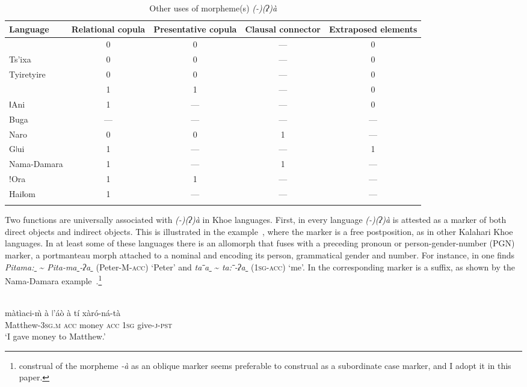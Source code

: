 \documentclass[output=paper]{LSP/langsci}
\begin{document}
\begin{table}[t]
\caption{Other uses of morpheme(s) \textit{(-)(ʔ)à}}\label{09-mc-tab:4}
{\small \begin{tabularx}{\textwidth}{XCCCC}
\lsptoprule
{\bfseries Language} & {\bfseries Relational copula} & {\bfseries Presentative copula} & {\bfseries Clausal connector} & {\bfseries Extraposed elements}\\
\midrule
{} & 0 & 0 & — & 0\\
Ts’ixa & 0 & 0 & — & 0\\
Tyiretyire & 0 & 0 & — & 0\\
 & 1 & 1 & — & 0\\
ǁAni & 1 & — & — & 0\\
Buga & — & — & — & —\\
Naro & 0 & 0 & 1 & —\\
Gǀui & 1 & — & — & 1\\
Nama-Damara & 1 & — & 1 & —\\
!Ora & 1 & 1 & — & —\\
Haiǁom & 1 & — & — & —\\
\lspbottomrule
\end{tabularx}}
\end{table}

\largerpage[-1]
Two functions are universally associated with \textit{(-)(ʔ)à} in Khoe languages. First, in every language \textit{(-)(ʔ)à} is attested as a marker of both direct objects and indirect objects. This is illustrated in the  example~, where the marker is a free postposition, as in other Kalahari Khoe languages. In at least some of these languages there is an allomorph that fuses with a preceding pronoun or person-gender-number (PGN) marker, a portmanteau morph attached to a nominal and encoding its person, grammatical gender and number. For instance, in  one finds \textit{Pitama:}\textit{ˍ} {\textasciitilde} \textit{Pita-maˍ-ʔaˍ} (Peter-\textsc{M}-\textsc{acc}) ‘Peter’ and \textit{ta}\textit{ˉ}\textit{a}\textit{ˍ} {\textasciitilde} \textit{ta:}\textit{ˉ{}-ʔ}\textit{a}\textit{ˍ} (1\textsc{sg}-\textsc{acc}) ‘me’. In  the corresponding marker is a suffix, as shown by the Nama-Damara example~.\footnote{ construal of the morpheme \emph{-à} as an oblique marker seems preferable to  construal as a subordinate case marker, and I adopt it in this paper.}

  
\begin{exe}
\ex\label{09-mc-ex:1}
\\
\gll màtìaci-\`{m} à ǀ’áò à tí xàró-ná-tà \\
Matthew-3\textsc{sg.m} \textsc{acc} money \textsc{acc} 1\textsc{sg} give-\textsc{j}-\textsc{pst}\\
\glt ‘I gave money to Matthew.’
\end{exe}
\end{document}
